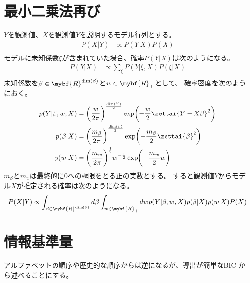 \section{最小二乗法再び}\label{s1:最小二乗法再び} %
	$Y$を観測値、$X$を観測値$Y$を説明するモデル行列とする。
	\begin{equation*}\begin{split} %
		P(X|Y) &\propto P(Y|X)P(X) \\
	\end{split}\end{equation*} %
	モデルに未知係数$\xi$が含まれていた場合、確率$P(Y|X)$は次のようになる。
	\begin{equation*}\begin{split} %
		P(Y|X) &\propto \sum_{\xi}P(Y|\xi,X)P(\xi|X) \\
	\end{split}\end{equation*} %
	未知係数を$\beta\in\mybf{R}^{\dim(\beta)}$と$w\in\mybf{R}_+$として、
	確率密度を次のようにおく。
	\begin{equation*}\begin{split} %
		p(Y|\beta,w,X) &= \biggl(\frac{w}{2\pi}\biggr)^{\frac{\dim(Y)}{2}}
			\exp\biggl(-\frac{w}{2}\zettai{Y-X\beta}^2\biggr) \\
		p(\beta|X)
			&= \biggl(\frac{m_\beta}{2\pi}\biggr)^{\frac{\dim(\beta)}{2}}
			\exp\biggl(-\frac{m_\beta}{2}\zettai{\beta}^2\biggr) \\
		p(w|X)
			&= \biggl(\frac{m_w}{2\pi}\biggr)^{\frac{1}{2}}
			w^{-\frac{1}{2}}\exp\biggl(-\frac{m_w}{2}w\biggr) \\
	\end{split}\end{equation*} %
	$m_\beta$と$m_w$は最終的に$0$への極限をとる正の実数とする。
	すると観測値$Y$からモデル$X$が推定される確率は次のようになる。
	\begin{equation*}\begin{split} %
		P(X|Y) \propto \int_{\beta\in\mybf{R}^{\dim(\beta)}}d\beta
			\int_{w\in\mybf{R}_+}dw p(Y|\beta,w,X)p(\beta|X)p(w|X)P(X)
	\end{split}\end{equation*} %


\section{情報基準量}\label{s1:情報基準量} %
	アルファベットの順序や歴史的な順序からは逆になるが、導出が簡単なBIC
	から述べることにする。

